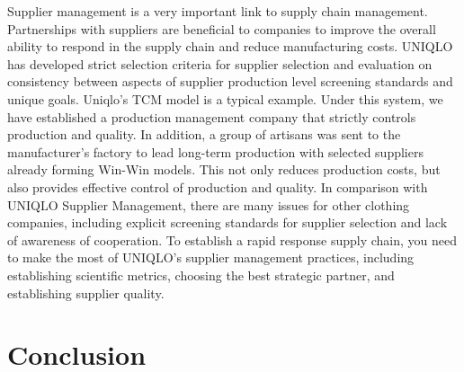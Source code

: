 \documentclass[12pt,]{article}
\begin{document}
Supplier management is a very important link to supply chain management.
Partnerships with suppliers are beneficial to companies to improve the
overall ability to respond in the supply chain and reduce manufacturing
costs. UNIQLO has developed strict selection criteria for supplier
selection and evaluation on consistency between aspects of supplier
production level screening standards and unique goals. Uniqlo's TCM
model is a typical example. Under this system, we have established a
production management company that strictly controls production and
quality. In addition, a group of artisans was sent to the manufacturer's
factory to lead long-term production with selected suppliers already
forming Win-Win models. This not only reduces production costs, but also
provides effective control of production and quality. In comparison with
UNIQLO Supplier Management, there are many issues for other clothing
companies, including explicit screening standards for supplier selection
and lack of awareness of cooperation. To establish a rapid response
supply chain, you need to make the most of UNIQLO's supplier management
practices, including establishing scientific metrics, choosing the best
strategic partner, and establishing supplier quality.

\hypertarget{conclusion}{%
\section{Conclusion}\label{conclusion}}
\end{document}
